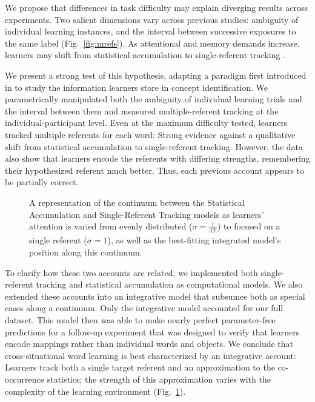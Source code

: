 \documentclass[man,floatsintext]{apa6}
\begin{document}
We propose that differences in task difficulty may explain diverging results across experiments. Two salient dimensions vary across previous studies: ambiguity of individual learning instances, and the interval between successive exposures to the same label (Fig.~\ref{fig:mrefs}). As attentional and memory demands increase, learners may shift from statistical accumulation to single-referent tracking \cite{Smith2011a, Trueswell2013}. 

We present a strong test of this hypothesis, adapting a paradigm first introduced in \cite{Bower1963} to study the information learners store in concept identification. We parametrically manipulated both the ambiguity of individual learning trials and the interval between them and measured multiple-referent tracking at the individual-participant level. Even at the maximum difficulty tested, learners tracked multiple referents for each word: Strong evidence against a qualitative shift from statistical accumulation to single-referent tracking. However, the data also show that learners encode the referents with differing strengths, remembering their hypothesized referent much better. Thus, each previous account appears to be partially correct. 


 \begin{figure}[t]
	\caption{\label{fig:models} A representation of the continuum between the Statistical Accumulation and Single-Referent Tracking models as learners' attention is varied from evenly distributed ($\sigma=\frac{1}{|O|}$) to focused on a single referent ($\sigma=1$), as well as the best-fitting integrated model's position along this continuum.}
\end{figure}

To clarify how these two accounts are related, we implemented both single-referent tracking and statistical accumulation as computational models. We also extended these accounts into an integrative model that subsumes both as special cases along a continuum. Only the integrative model accounted for our full dataset. This model then was able to make nearly perfect parameter-free predictions for a follow-up experiment that was designed to verify that learners encode mappings rather than individual words and objects. We conclude that cross-situational word learning is best characterized by an integrative account: Learners track both a single target referent and an approximation to the co-occurrence statistics; the strength of this approximation varies with the complexity of the learning environment (Fig.~\ref{fig:models}).
\end{document}

